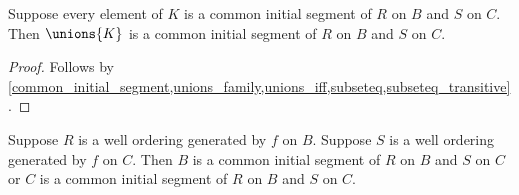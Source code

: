 \begin{lemma}\label{union_common_initial_segments}
    Suppose every element of $K$ is a common initial segment of $R$ on $B$ and $S$ on $C$.
    Then $\unions{K}$ is a common initial segment of $R$ on $B$ and $S$ on $C$.
\end{lemma}
\begin{proof}
    Follows by \cref{common_initial_segment,unions_family,unions_iff,subseteq,subseteq_transitive}.
\end{proof}

\begin{lemma}\label{generated_well_orderings_compatible}
    Suppose $R$ is a well ordering generated by $f$ on $B$.
    Suppose $S$ is a well ordering generated by $f$ on $C$.
    Then $B$ is a common initial segment of $R$ on $B$ and $S$ on $C$
    or $C$ is a common initial segment of $R$ on $B$ and $S$ on $C$.
\end{lemma}
